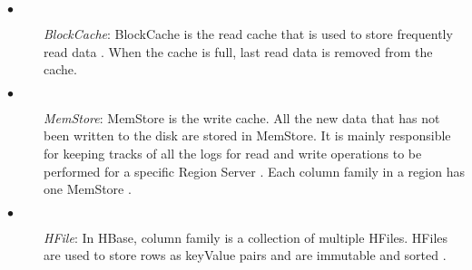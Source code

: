 \documentclass[11pt,a4paper,bibtotoc,idxtotoc,headsepline,footsepline,footexclude,BCOR12mm,DIV13]{scrbook}
\begin{document}
\begin{description}
	\item[$\bullet$]  \emph{BlockCache}: BlockCache is the read cache that is used to store frequently read data \cite{hbase:insights}. When the cache is full, last read data is removed from the cache.
\end{description}

\begin{description}
	\item[$\bullet$] \emph{MemStore}: MemStore is the write cache. All the new data that has not been written to the disk are stored in MemStore. It is mainly responsible for keeping tracks of all the logs for read and write operations to be performed for a specific Region Server \cite{hbase:architecture}. Each column family in a region has one MemStore \cite{hbase:insights}.
\end{description}

\begin{description}
	\item[$\bullet$] \emph{HFile}: In HBase, column family is a collection of multiple HFiles. HFiles are used to store rows as keyValue pairs and are immutable and sorted \cite{hbase:insights}.
\end{description}
\end{document}
